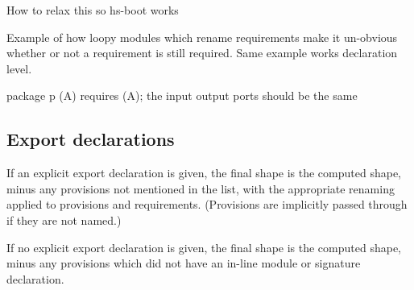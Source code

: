 \documentclass{article}
\newcommand{\Red}[1]{{\color{red} #1}}
\begin{document}
\Red{How to relax this so hs-boot works}

\Red{Example of how loopy modules which rename requirements make it un-obvious whether or not
a requirement is still required.  Same example works declaration level.}

\Red{package p (A) requires (A); the input output ports should be the same}

%
%
%

\newpage

\subsection{Export declarations}

If an explicit export declaration is given, the final shape is the
computed shape, minus any provisions not mentioned in the list, with the
appropriate renaming applied to provisions and requirements.  (Provisions
are implicitly passed through if they are not named.)

If no explicit export declaration is given, the final shape is
the computed shape, minus any provisions which did not have an in-line
module or signature declaration.
\end{document}
